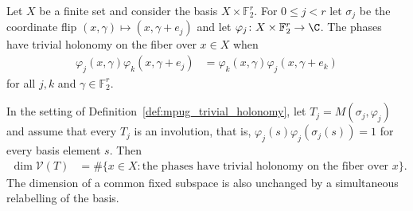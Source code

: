 \begin{definition}
    \label{def:mpug_trivial_holonomy}
    \leanok
    Let $X$ be a finite set and consider the basis $X\times\mathbb F_2^r$.
    For $0\leq j<r$ let $\sigma_j$ be the coordinate flip
    $(x,\gamma)\mapsto(x,\gamma+e_j)$ and let
    $\varphi_j\colon X\times\mathbb F_2^r\to\C$. The phases have trivial
    holonomy on the fiber over $x\in X$ when
    \begin{align}
        \varphi_j(x,\gamma)\varphi_k(x,\gamma+e_j)
         & =\varphi_k(x,\gamma)\varphi_j(x,\gamma+e_k)
        \label{eq:mpug_trivial_holonomy}
    \end{align}
    for all $j,k$ and $\gamma\in\mathbb F_2^r$.
\end{definition}

\begin{lemma}
    \label{thm:mpug_monomial_fixed_space_criterion}
    \leanok
    In the setting of Definition~\ref{def:mpug_trivial_holonomy}, let
    $T_j=M(\sigma_j,\varphi_j)$ and assume that every $T_j$ is an involution,
    that is, $\varphi_j(s)\varphi_j(\sigma_j(s))=1$ for every basis element
    $s$. Then
    \begin{align}
        \dim\mathcal V(T)
         & =\#\{x\in X:\text{the phases have trivial holonomy on the fiber over }x\}.
        \label{eq:mpug_monomial_fixed_space_count}
    \end{align}
    The dimension of a common fixed subspace is also unchanged by a
    simultaneous relabelling of the basis.
\end{lemma}

